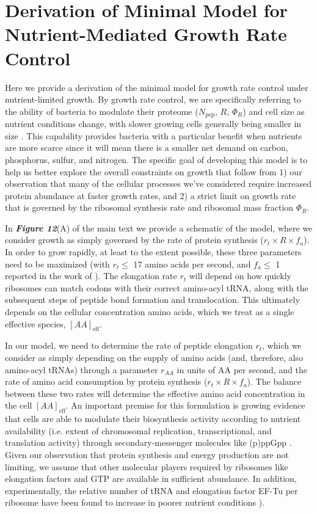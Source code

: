 \section{Derivation of Minimal Model for Nutrient-Mediated Growth Rate Control}
\label{sec:SI_model}
Here we provide a derivation of the minimal model for growth rate control under
nutrient-limited growth. By growth rate control, we are specifically referring
to the ability of bacteria to modulate their proteome ($N_\text{pep}$, $R$,
$\Phi_R$) and cell size as nutrient conditions change, with slower growing cells
generally being smaller in size \citep{ojkic2019}. This capability provides
bacteria with  a particular benefit when nutrients are more scarce since it will
mean there is a  smaller net demand on carbon, phosphorus, sulfur, and nitrogen.
The specific goal  of developing this model is to help us better explore the
overall constraints on  growth that follow from 1) our observation that many  of
the cellular processes we've considered require increased protein abundance at
faster growth rates, and 2) a strict limit on growth rate that is
governed by the ribosomal synthesis rate and ribosomal mass fraction $\Phi_R$.

In \textbf{\textit{Figure 12}}(A) of the main text we provide a schematic of the
model, where we consider growth as simply governed by the rate of protein
synthesis ($r_t \times R \times f_a$). In order to grow rapidly, at least to the
extent possible, these three parameters need to be maximized (with $r_t \leq$ 17
amino acids per second, and $f_a \leq$ 1 reported in the work of
\cite{dai2016}). The elongation rate $r_t$ will depend on how quickly
ribosomes can match codons with their correct amino-acyl tRNA, along with the
subsequent steps of peptide bond formation and translocation. This ultimately
depends on the cellular concentration amino acids, which we treat as a single
effective species, $[AA]_\text{eff}$.

In our model, we need to determine the rate of peptide elongation $r_t$, which we
consider as simply depending on the supply of amino acids (and,
therefore, also amino-acyl tRNAs) through a parameter $r_{AA}$ in units of AA
per second, and the rate of amino acid consumption by protein synthesis ($r_t
\times R \times f_a$). The balance between these two rates will determine the
effective amino acid concentration in the cell $[AA]_\text{eff}$. An important
premise for this formulation is growing evidence that cells are able to modulate
their biosynthesis activity according to nutrient availability (i.e. extent of
chromosomal replication, transcriptional, and translation activity) through
secondary-messenger molecules like (p)ppGpp \citep{hauryliuk2015, zhu2019,
kraemer2019, fernandezcoll2020, Buke2020}. Given our observation that protein
synthesis and energy production are not limiting, we assume that other molecular
players required by ribosomes like elongation factors and GTP are available in
sufficient abundance. In addition, experimentally, the relative number of tRNA
and elongation factor EF-Tu per ribosome have been found to increase in poorer
nutrient conditions \cite{pedersen1978, dong1996, klumpp2013}).

